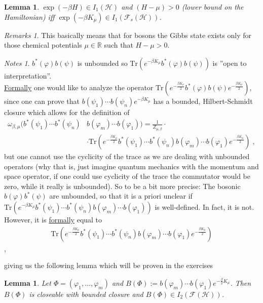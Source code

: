 \documentclass[
a4paper, %
11pt, %
onecolumn, %
openany, %
]{memoir}
\theoremstyle{definition}
\theoremstyle{remark}
\newtheorem{remarks}[definition]{Remarks}
\newtheorem{notes}[definition]{Notes}
\theoremstyle{plain}
\newtheorem{lemma}[definition]{Lemma}
\begin{document}
\begin{lemma}
	$\exp(-\beta H)\in I_1(\mathcal{H})$ and $(H-\mu)>0$ (lower bound on the Hamiltonian) iff $\exp(-\beta K_{\mu})\in I_1(\mathcal{F}_s(\mathcal{H}))$.
\end{lemma}
\begin{remarks}
This basically means that for bosons the Gibbs state exists only for those chemical potentials $\mu\in\mathbb{R}$ such that $H-\mu>0$.
\end{remarks}
\begin{notes}
	$b^*(\varphi)b(\psi)$ is unbounded so $\mathrm{Tr}(e^{-\beta K_{\mu}}b^*(\varphi)b(\psi))$ is ''open to interpretation''.\\
	\underline{Formally} one would like to analyze the operator $\mathrm{Tr}\left( e^{-\frac{\beta K_{\mu}}{2}}b^*(\varphi)b(\psi)e^{-\frac{\beta K_{\mu}}{2}}\right)$, since one can prove that $b(\psi_1)\cdots b(\psi_n)e^{-\beta K_{\mu}}$ has a bounded, Hilbert-Schmidt closure which allows for the definition of \begin{align}
		\omega_{\beta,\mu}(b^*(\psi_1)\cdots b^*(\psi_n)&b(\varphi_m)\cdots b(\varphi_1))=\frac{1}{Z_{\mu,\beta}}\cdot \\ &\cdot \mathrm{Tr}\left(e^{-\frac{\beta K_{\mu}}{2}}b^*(\psi_1)\cdots b^*(\psi_n)b(\varphi_m)\cdots b(\varphi_1)e^{-\frac{\beta K_{\mu}}{2}}\right)\; ,
	\end{align}
	but one cannot use the cyclicity of the trace as we are dealing with unbounded operators (why that is, just imagine quantum mechanics with the momentum and space operator, if one could use cyclicity of the trace the commutator would be zero, while it really is unbounded). So to be a bit more precise: The bosonic $b(\varphi)b^*(\psi)$ are unbounded, so that it is a priori unclear if $\mathrm{Tr}(e^{-\beta K_{\mu}}b^*(\psi_1)\cdots b^*(\psi_n)b(\varphi_m)\cdots b(\varphi_1))$ is well-defined. In fact, it is not. However, it is \underline{formally} equal to \begin{align}\mathrm{Tr}\left(e^{-\frac{\beta K_{\mu}}{2}}b^*(\psi_1)\cdots b^*(\psi_n)b(\varphi_m)\cdots b(\varphi_1)e^{-\frac{\beta K_{\mu}}{2}}\right)\end{align}\; ,
\end{notes}
giving us the following lemma which will be proven in the exercises \begin{lemma}
Let $\Phi=(\varphi_1,\ldots,\varphi_m)$ and $B(\Phi):=b(\varphi_m)\cdots b(\varphi_1)e^{-\frac{\beta}{2}K_{\mu}}$. Then $B(\Phi)$ is closeable with bounded closure and $B(\Phi)\in I_2(\mathcal{F}(\mathcal{H}))$.\end{lemma}
\end{document}
